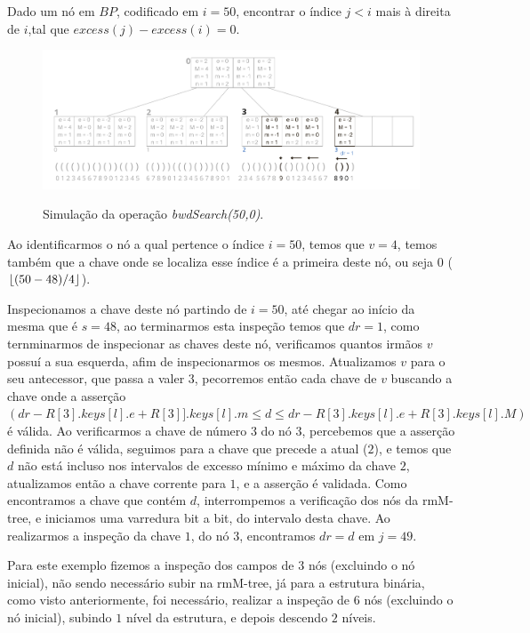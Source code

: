     \begin{example}
    Dado um nó em $BP$, codificado em $i=50$, encontrar o  índice $j<i$ mais à direita de $i$,tal que $excess(j) - excess(i) = 0$.
    \begin{figure}[!ht]
        \centering
          \caption[bwdSearch(50,0).]{Simulação da operação \textit{bwdSearch(50,0)}.}
          \includegraphics[width=\columnwidth]{images/rmm-tree-kary-bwdsearch.png}
          \label{fig:kary-bwdSearch}
     \end{figure}


     Ao identificarmos o nó a qual pertence o índice $i=50$, temos que $v=4$, temos também que a chave onde se localiza esse índice é a primeira deste nó, 
     ou seja $0$ ($\lfloor(50-48)/4\rfloor$). 
     
     Inspecionamos a chave deste nó partindo de $i=50$, até chegar ao início da mesma que é $s=48$, ao terminarmos esta inspeção temos que $dr=1$, como ternminarmos
     de inspecionar as chaves deste nó, verificamos quantos irmãos $v$ possuí a sua esquerda, afim de inspecionarmos os mesmos. 
     Atualizamos $v$ para o seu antecessor, que passa a valer $3$, pecorremos então cada chave de $v$ 
     buscando a chave onde a asserção $(dr - R[3].keys[l].e + R[3]].keys[l].m \leq d \leq dr - R[3].keys[l].e + R[3].keys[l].M)$
     é válida. Ao  verificarmos a chave de número $3$ do nó $3$, percebemos que a asserção definida não é válida, seguimos para a chave que precede a atual ($2$), 
     e temos que $d$ não está incluso nos intervalos de excesso mínimo e máximo da chave $2$,
     atualizamos então a chave corrente para $1$, e a asserção é validada. Como encontramos a chave que contém $d$, interrompemos a verificação dos nós da rmM-tree,
    e iniciamos uma varredura bit a bit, do intervalo desta chave.
     Ao realizarmos a inspeção da chave $1$, do nó $3$, encontramos $dr=d$ em $j=49$.
     

     Para este exemplo fizemos a inspeção dos campos de $3$ nós (excluindo o nó inicial), não sendo necessário subir na rmM-tree, já para a estrutura binária, 
     como visto anteriormente, foi necessário, realizar a inspeção de 
     $6$ nós (excluindo o nó inicial), subindo $1$ nível da estrutura, e depois descendo $2$ níveis.
     
    \end{example}


